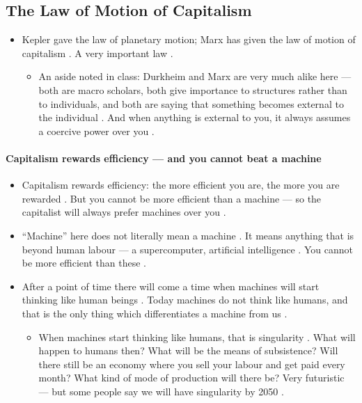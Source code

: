 \subsection{The Law of Motion of Capitalism}
\begin{itemize}
    \item Kepler gave the law of planetary motion; Marx has given the law of motion of capitalism . A very important law .
    \begin{itemize}
        \item An aside noted in class: Durkheim and Marx are very much alike here --- both are macro scholars, both give importance to structures rather than to individuals, and both are saying that something becomes external to the individual . And when anything is external to you, it always assumes a coercive power over you .
    \end{itemize}
\end{itemize}

\paragraph{Capitalism rewards efficiency --- and you cannot beat a machine}
\begin{itemize}
    \item Capitalism rewards efficiency: the more efficient you are, the more you are rewarded . But you cannot be more efficient than a machine --- so the capitalist will always prefer machines over you .
    \item ``Machine'' here does not literally mean a machine . It means anything that is beyond human labour --- a supercomputer, artificial intelligence . You cannot be more efficient than these .
    \item After a point of time there will come a time when machines will start thinking like human beings . Today machines do not think like humans, and that is the only thing which differentiates a machine from us .
    \begin{itemize}
        \item When machines start thinking like humans, that is singularity . What will happen to humans then? What will be the means of subsistence? Will there still be an economy where you sell your labour and get paid every month? What kind of mode of production will there be? Very futuristic --- but some people say we will have singularity by 2050 .
    \end{itemize}
\end{itemize}

